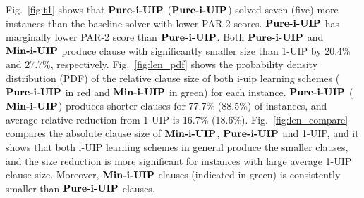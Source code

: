 \documentclass[runningheads]{llncs}
\begin{document}
Fig.~\ref{fig:t1} shows that $\textbf{Pure-i-UIP}$ ($\textbf{Pure-i-UIP}$) solved seven
(five) more instances than the baseline solver with lower PAR-2
scores. $\textbf{Pure-i-UIP}$ has marginally lower PAR-2 score than
$\textbf{Pure-i-UIP}$. Both $\textbf{Pure-i-UIP}$ and $\textbf{Min-i-UIP}$ produce clause with
significantly smaller size than 1-UIP by 20.4\% and 27.7\%,
respectively. Fig.~\ref{fig:len_pdf} shows the probability density
distribution (PDF) of the relative clause size of both i-uip learning
schemes ($\textbf{Pure-i-UIP}$ in red and $\textbf{Min-i-UIP}$ in green) for each
instance. $\textbf{Pure-i-UIP}$ ($\textbf{Min-i-UIP}$) produces shorter clauses for 77.7\%
(88.5\%) of instances, and average relative reduction from 1-UIP is
16.7\% (18.6\%). Fig.~\ref{fig:len_compare} compares the absolute
clause size of $\textbf{Min-i-UIP}$, $\textbf{Pure-i-UIP}$ and 1-UIP, and it shows that
both i-UIP learning schemes in general produce the smaller clauses,
and the size reduction is more significant for instances with large
average 1-UIP clause size. Moreover, $\textbf{Min-i-UIP}$ clauses (indicated in
green) is consistently smaller than $\textbf{Pure-i-UIP}$ clauses.
\end{document}
